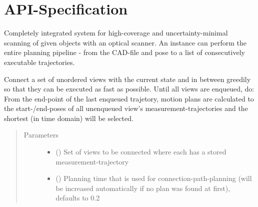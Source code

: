 \documentclass[letterpaper,10pt,english]{sphinxmanual}
\begin{document}
\section{API-Specification}
\label{\detokenize{module_trajectory_manager:api-specification}}\label{\detokenize{module_trajectory_manager:module-agiprobot_measurement.trajectory_manager}}

\begin{fulllineitems}
\label{\detokenize{module_trajectory_manager:agiprobot_measurement.trajectory_manager.TrajectoryManager}}
Completely integrated system for high-coverage and uncertainty-minimal scanning of given objects with an optical scanner. An instance can perform
the entire planning pipeline - from the CAD-file and pose to a list of consecutively executable trajectories.

\begin{fulllineitems}
\label{\detokenize{module_trajectory_manager:agiprobot_measurement.trajectory_manager.TrajectoryManager.connect_views}}
Connect a set of unordered views with the current state and in between greedily so that they can be executed as fast as possible.
Until all views are enqueued, do: From the end-point of the last enqueued trajetory, motion plans are calculated to the start-/end-poses
of all unenqueued view’s measurement-trajectories and the shortest (in time domain) will be selected.
\begin{quote}\begin{description}
\item[{Parameters}] \leavevmode\begin{itemize}
\item {} 
 (\sphinxstyleliteralemphasis{{[}}\sphinxstyleliteralemphasis{{]}}) \textendash{} Set of views to be connected where each has a stored measurement-trajectory

\item {} 
 (\sphinxstyleliteralemphasis{, }) \textendash{} Planning time that is used for connection-path-planning (will be increased automatically if no plan was found at first), defaults to 0.2


\end{itemize}
\end{description}
\end{quote}
\end{fulllineitems}
\end{fulllineitems}
\end{document}
